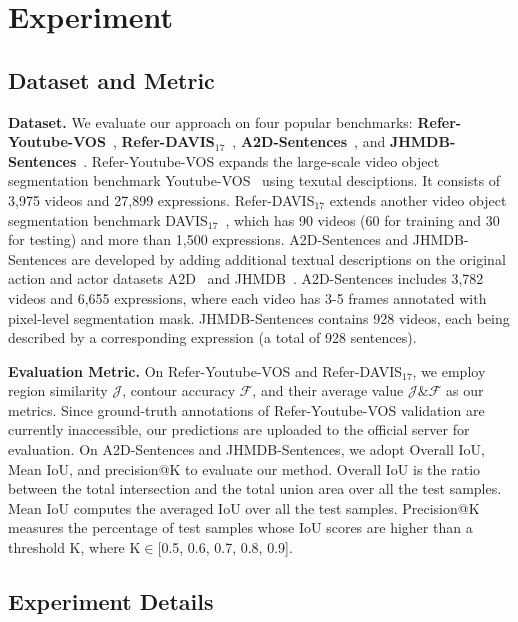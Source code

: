 \documentclass[10pt,twocolumn,letterpaper]{article}
\begin{document}
\section{Experiment}

\subsection{Dataset and Metric}
\noindent \textbf{Dataset.}
We evaluate our approach on four popular benchmarks: \textbf{Refer-Youtube-VOS}~\cite{URVOS}, \textbf{Refer-DAVIS$_{17}$}~\cite{khoreva2019video}, \textbf{A2D-Sentences}~\cite{gavrilyuk2018actor}, and \textbf{JHMDB-Sentences}~\cite{gavrilyuk2018actor}.
{Refer-Youtube-VOS} expands the large-scale video object segmentation benchmark Youtube-VOS~\cite{xu2018youtube} using texutal desciptions. It consists of 3,975 videos and  27,899 expressions. 
{Refer-DAVIS$_{17}$} extends another video object segmentation benchmark DAVIS$_{17}$~\cite{pont20172017}, which has 90 videos (60 for training and 30 for testing) and more than 1,500 expressions.
A2D-Sentences and JHMDB-Sentences are developed by adding additional textual descriptions on the original action and actor datasets A2D~\cite{xu2015can} and JHMDB~\cite{jhuang2013towards}.
A2D-Sentences includes 3,782 videos and 6,655 expressions, where each video has 3-5 frames annotated with pixel-level segmentation mask.
JHMDB-Sentences contains 928 videos, each being described by a corresponding expression (a total of 928 sentences).

\noindent\textbf{Evaluation Metric.}
On Refer-Youtube-VOS and Refer-DAVIS$_{17}$, we employ region similarity $\mathcal{J}$, contour accuracy $\mathcal{F}$, and their average value $\mathcal{J} \& \mathcal{F}$ as our metrics.
Since  ground-truth annotations of Refer-Youtube-VOS validation are currently inaccessible, our predictions are uploaded to the official server for evaluation.
On A2D-Sentences and JHMDB-Sentences, we  adopt  Overall IoU, Mean IoU, and precision@K to evaluate our method. Overall IoU is the ratio between the total intersection and the total union area over all the test samples. Mean IoU computes the averaged IoU over all the test samples. 
Precision@K measures the percentage of test samples whose IoU scores are higher than a threshold K, where K$\in$[0.5, 0.6, 0.7, 0.8, 0.9].







\subsection{Experiment Details}
\end{document}
